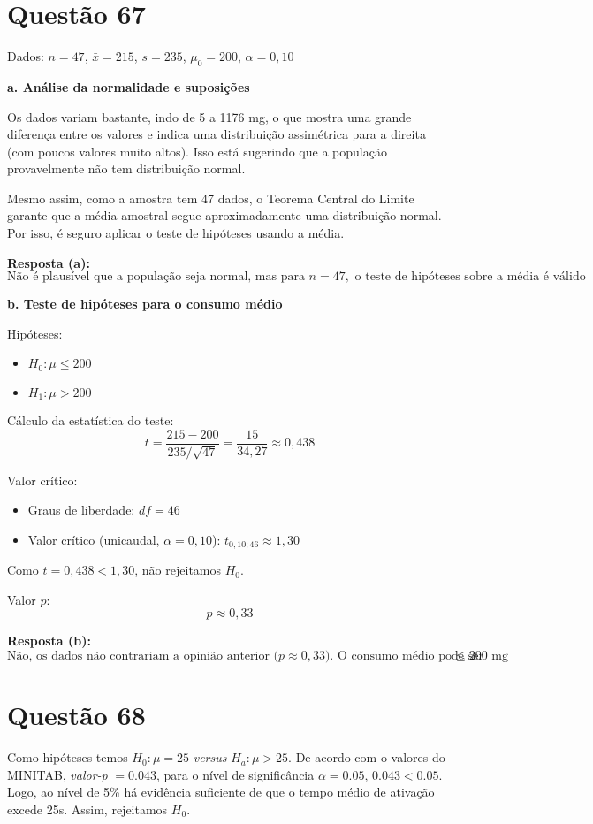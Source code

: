 \documentclass[12pt]{article}
\newcommand{\quest}[1]{\section*{Questão #1}} %
\begin{document}
\quest{67}

Dados: $n = 47$, $\bar{x} = 215$, $s = 235$, $\mu_0 = 200$, $\alpha = 0{,}10$

\textbf{a. Análise da normalidade e suposições}

Os dados variam bastante, indo de 5 a 1176 mg, o que mostra uma grande diferença entre os valores e indica uma distribuição assimétrica para a direita (com poucos valores muito altos). Isso está sugerindo que a população provavelmente não tem distribuição normal.

Mesmo assim, como a amostra tem 47 dados, o Teorema Central do Limite garante que a média amostral segue aproximadamente uma distribuição normal. Por isso, é seguro aplicar o teste de hipóteses usando a média.

\textbf{Resposta (a):}
\[
\boxed{\text{Não é plausível que a população seja normal, mas para } n = 47, \text{ o teste de hipóteses sobre a média é válido}}
\]

\textbf{b. Teste de hipóteses para o consumo médio}

Hipóteses:
\begin{itemize}
  \item $H_0: \mu \leq 200$
  \item $H_1: \mu > 200$
\end{itemize}

Cálculo da estatística do teste:
\[
t = \frac{215 - 200}{235 / \sqrt{47}} = \frac{15}{34{,}27} \approx 0{,}438
\]

Valor crítico:
\begin{itemize}
  \item Graus de liberdade: $df = 46$
  \item Valor crítico (unicaudal, $\alpha = 0{,}10$): $t_{0{,}10; 46} \approx 1{,}30$
\end{itemize}

Como $t = 0{,}438 < 1{,}30$, não rejeitamos $H_0$.

Valor $p$:
\[
p \approx 0{,}33
\]

\textbf{Resposta (b):}
\[
\boxed{\text{Não, os dados não contrariam a opinião anterior ($p \approx 0{,}33$). O consumo médio pode ser } \leq 200 \text{ mg}}
\]

\quest{68}
Como hipóteses temos $H_0: \mu = 25$ \textit{versus} $H_a: \mu > 25$. De acordo com o valores do MINITAB, \textit{valor-p} $= 0.043$, para o nível de significância $\alpha = 0.05$, $0.043 < 0.05$. Logo, ao nível de 5\% há evidência suficiente de que o tempo médio de ativação excede 25s. Assim, rejeitamos $H_0$.
\end{document}
